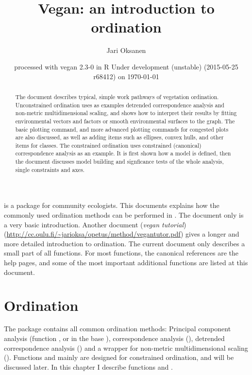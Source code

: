 \documentclass[a4paper,10pt]{article}
\title{Vegan: an introduction to ordination}
\author{Jari Oksanen}
\date{\footnotesize{
  processed with vegan
2.3-0
in R Under development (unstable) (2015-05-25 r68412) on \today}}
\begin{document}
\maketitle
\begin{abstract}
  The document describes typical, simple work pathways of
  vegetation ordination. Unconstrained ordination uses as examples
  detrended correspondence analysis and non-metric multidimensional
  scaling, and shows how to interpret their results by fitting
  environmental vectors and factors or smooth environmental surfaces
  to the graph. The basic plotting command, and more advanced plotting
  commands for congested plots are also discussed, as well as adding
  items such as ellipses, convex hulls, and other items for
  classes. The constrained ordination uses constrained (canonical)
  correspondence analysis as an example. It is first shown how a model
  is defined, then the document discusses model building and
  signficance tests of the whole analysis, single constraints and
  axes.
\end{abstract}
\tableofcontents

\vspace{3ex}
\noindent {} is a package for community ecologists.  This
documents explains how the commonly used ordination methods can be
performed in .  The document only is a very basic
introduction.  Another document (\emph{vegan tutorial})
(\url{http://cc.oulu.fi/~jarioksa/opetus/method/vegantutor.pdf}) gives
a longer and more detailed introduction to ordination.  The
current document only describes a small part of all 
functions.  For most functions, the canonical references are the
 help pages, and some of the most important additional
functions are listed at this document.

\section{Ordination}

The  package contains all common ordination methods:
Principal component analysis (function , or  in
the base ), correspondence analysis (),
detrended correspondence analysis () and a wrapper for
non-metric multidimensional scaling ().  Functions
 and  mainly are designed for constrained
ordination, and will be discussed later.  In this chapter I describe
functions  and .
\end{document}
